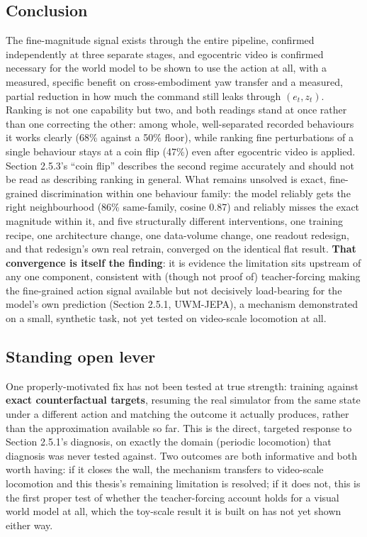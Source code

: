 \documentclass[12pt,a4paper,oneside]{report}
\begin{document}
\subsection{Conclusion}
The fine-magnitude signal exists through the entire pipeline, confirmed independently at three separate stages,
and egocentric video is confirmed necessary for the world model to be shown to use the action at all, with a
measured, specific benefit on cross-embodiment yaw transfer and a measured, partial reduction in how much the
command still leaks through $(e_t, z_t)$. Ranking is not one capability but two, and both readings stand at once
rather than one correcting the other: among whole, well-separated recorded behaviours it works clearly (68\%
against a 50\% floor), while ranking fine perturbations of a single behaviour stays at a coin flip (47\%) even
after egocentric video is applied. Section 2.5.3's ``coin flip'' describes the second regime accurately and
should not be read as describing ranking in general. What remains unsolved is exact, fine-grained discrimination
within one behaviour family: the model reliably gets the right neighbourhood (86\% same-family, cosine 0.87) and
reliably misses the exact magnitude within it, and five structurally different interventions, one training
recipe, one architecture change, one data-volume change, one readout redesign, and that redesign's own real
retrain, converged on the identical flat result. \textbf{That convergence is itself the finding}: it is
evidence the limitation sits upstream of any one component, consistent with (though not proof of) teacher-forcing
making the fine-grained action signal available but not decisively load-bearing for the model's own prediction
(Section 2.5.1, UWM-JEPA), a mechanism demonstrated on a small, synthetic task, not yet tested on video-scale
locomotion at all.

\subsection{Standing open lever}
One properly-motivated fix has not been tested at true strength: training against \textbf{exact counterfactual
targets}, resuming the real simulator from the same state under a different action and matching the outcome it
actually produces, rather than the approximation available so far. This is the direct, targeted response to
Section 2.5.1's diagnosis, on exactly the domain (periodic locomotion) that diagnosis was never tested against.
Two outcomes are both informative and both worth having: if it closes the wall, the mechanism transfers to
video-scale locomotion and this thesis's remaining limitation is resolved; if it does not, this is the first
proper test of whether the teacher-forcing account holds for a visual world model at all, which the toy-scale
result it is built on has not yet shown either way.
\end{document}
